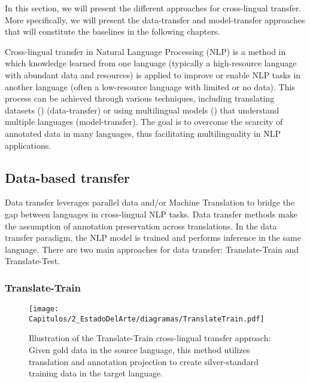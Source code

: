 In this section, we will present the different approaches for cross-lingual transfer. More specifically, we will present the data-transfer and model-transfer approaches that will constitute the baselines in the following chapters. 

Cross-lingual transfer in Natural Language Processing (NLP) is a method in which knowledge learned from one language (typically a high-resource language with abundant data and resources) is applied to improve or enable NLP tasks in another language (often a low-resource language with limited or no data). This process can be achieved through various techniques, including translating datasets (\cite{Ehrmann}) (data-transfer) or using multilingual models (\cite{devlin-etal-2019-bert,conneau-etal-2020-unsupervised}) that understand multiple languages (model-transfer). The goal is to overcome the scarcity of annotated data in many languages, thus facilitating multilinguality in NLP applications. 

\subsection{Data-based transfer}



Data transfer leverages parallel data and/or Machine Translation to bridge the gap between languages in cross-lingual NLP tasks. Data transfer methods make the assumption of annotation preservation across translations. In the data transfer paradigm, the NLP model is trained and performs inference in the same language. There are two main approaches for data transfer: Translate-Train and Translate-Test. 

\subsubsection{Translate-Train} 


\begin{wrapfigure}{r}{0.55\linewidth}
\vspace{-0.481cm}
    \centering
    \texttt{[image: Capitulos/2\_EstadoDelArte/diagramas/TranslateTrain.pdf]}
    \caption{Illustration of the Translate-Train cross-lingual transfer approach: Given gold data in the source language, this method utilizes translation and annotation projection to create silver-standard training data in the target language.}
    \label{fig:chap3_translatetrain}
    \vspace{-0.5cm}
\end{wrapfigure} 

